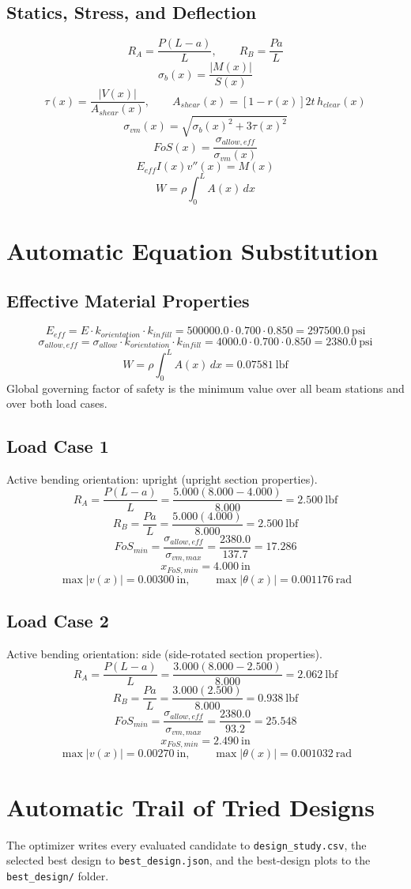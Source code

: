 \documentclass[11pt]{article}
\begin{document}
\subsection*{Statics, Stress, and Deflection}
\[
R_A=\frac{P(L-a)}{L}, \qquad R_B=\frac{Pa}{L}
\]
\[
\sigma_b(x)=\frac{|M(x)|}{S(x)}
\]
\[
\tau(x)=\frac{|V(x)|}{A_{shear}(x)}, \qquad A_{shear}(x)=[1-r(x)]2t\,h_{clear}(x)
\]
\[
\sigma_{vm}(x)=\sqrt{\sigma_b(x)^2+3\tau(x)^2}
\]
\[
FoS(x)=\frac{\sigma_{allow,eff}}{\sigma_{vm}(x)}
\]
\[
E_{eff}I(x)v''(x)=M(x)
\]
\[
W=\rho\int_0^L A(x)\,dx
\]

\section*{Automatic Equation Substitution}
\subsection*{Effective Material Properties}
\[E_{eff} = E \cdot k_{orientation} \cdot k_{infill} = 500000.0 \cdot 0.700 \cdot 0.850 = 297500.0\ \mathrm{psi}\]
\[\sigma_{allow,eff} = \sigma_{allow} \cdot k_{orientation} \cdot k_{infill} = 4000.0 \cdot 0.700 \cdot 0.850 = 2380.0\ \mathrm{psi}\]
\[W = \rho \int_0^L A(x)\,dx = 0.07581\ \mathrm{lbf}\]
Global governing factor of safety is the minimum value over all beam stations and over both load cases.
\subsection*{Load Case 1}
Active bending orientation: upright (upright section properties).
\[R_A = \frac{P(L-a)}{L} = \frac{5.000(8.000-4.000)}{8.000} = 2.500\ \mathrm{lbf}\]
\[R_B = \frac{Pa}{L} = \frac{5.000(4.000)}{8.000} = 2.500\ \mathrm{lbf}\]
\[FoS_{min} = \frac{\sigma_{allow,eff}}{\sigma_{vm,max}} = \frac{2380.0}{137.7} = 17.286\]
\[x_{FoS,min} = 4.000\ \mathrm{in}\]
\[\max |v(x)| = 0.00300\ \mathrm{in}, \qquad \max |\theta(x)| = 0.001176\ \mathrm{rad}\]
\subsection*{Load Case 2}
Active bending orientation: side (side-rotated section properties).
\[R_A = \frac{P(L-a)}{L} = \frac{3.000(8.000-2.500)}{8.000} = 2.062\ \mathrm{lbf}\]
\[R_B = \frac{Pa}{L} = \frac{3.000(2.500)}{8.000} = 0.938\ \mathrm{lbf}\]
\[FoS_{min} = \frac{\sigma_{allow,eff}}{\sigma_{vm,max}} = \frac{2380.0}{93.2} = 25.548\]
\[x_{FoS,min} = 2.490\ \mathrm{in}\]
\[\max |v(x)| = 0.00270\ \mathrm{in}, \qquad \max |\theta(x)| = 0.001032\ \mathrm{rad}\]

\section*{Automatic Trail of Tried Designs}
The optimizer writes every evaluated candidate to \texttt{design\_study.csv}, the selected best design to \texttt{best\_design.json}, and the best-design plots to the \texttt{best\_design/} folder.
\end{document}
